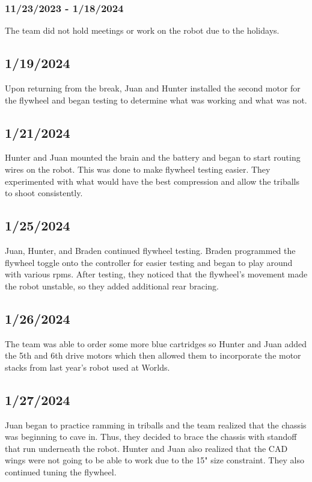 
\subsubsection{11/23/2023 - 1/18/2024}
The team did not hold meetings or work on the robot due to the holidays.

\subsection{1/19/2024}
Upon returning from the break, Juan and Hunter installed the second motor for the flywheel and began testing to 
determine what was working and what was not. 

\subsection{1/21/2024}
Hunter and Juan mounted the brain and the battery and began to start routing wires on the robot. This was done 
to make flywheel testing easier. They experimented with what would have the best compression and allow the triballs 
to shoot consistently. 

\subsection{1/25/2024}
Juan, Hunter, and Braden continued flywheel testing. Braden programmed the flywheel toggle onto the controller for easier 
testing and began to play around with various rpms. After testing, they noticed that the flywheel's movement 
made the robot unstable, so they added additional rear bracing.


\subsection{1/26/2024}
The team was able to order some more blue cartridges so Hunter and Juan added the 5th and 6th drive motors which then
allowed them to incorporate the motor stacks from last year's robot used at Worlds.


\subsection{1/27/2024}
Juan began to practice ramming in triballs and the team realized that the chassis was beginning to cave in. Thus, they
decided to brace the chassis with standoff that run underneath the robot. Hunter and Juan also realized that the CAD wings
were not going to be able to work due to the 15" size constraint. They also continued tuning the flywheel.

